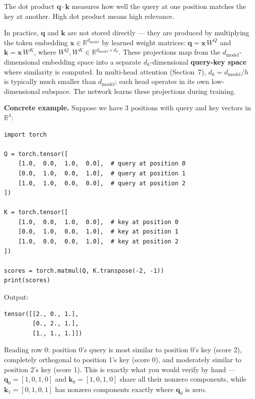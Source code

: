 The dot product $\mathbf{q} \cdot \mathbf{k}$ measures how well the query at one position matches the key at another. High dot product means high relevance.

In practice, $\mathbf{q}$ and $\mathbf{k}$ are not stored directly --- they are produced by multiplying the token embedding $\mathbf{x} \in \mathbb{R}^{d_{\text{model}}}$ by learned weight matrices: $\mathbf{q} = \mathbf{x}\, W^Q$ and $\mathbf{k} = \mathbf{x}\, W^K$, where $W^Q, W^K \in \mathbb{R}^{d_{\text{model}} \times d_k}$. These projections map from the $d_{\text{model}}$-dimensional embedding space into a separate $d_k$-dimensional \textbf{query-key space} where similarity is computed. In multi-head attention (Section~7), $d_k = d_{\text{model}} / h$ is typically much smaller than $d_{\text{model}}$; each head operates in its own low-dimensional subspace. The network learns these projections during training.

\textbf{Concrete example.} Suppose we have 3 positions with query and key vectors in $\mathbb{R}^4$:

\demotag
\begin{lstlisting}
import torch

Q = torch.tensor([
    [1.0,  0.0,  1.0,  0.0],  # query at position 0
    [0.0,  1.0,  0.0,  1.0],  # query at position 1
    [1.0,  1.0,  0.0,  0.0],  # query at position 2
])

K = torch.tensor([
    [1.0,  0.0,  1.0,  0.0],  # key at position 0
    [0.0,  1.0,  0.0,  1.0],  # key at position 1
    [1.0,  0.0,  0.0,  1.0],  # key at position 2
])

scores = torch.matmul(Q, K.transpose(-2, -1))
print(scores)
\end{lstlisting}

Output:

\outputtag
\begin{lstlisting}
tensor([[2., 0., 1.],
        [0., 2., 1.],
        [1., 1., 1.]])
\end{lstlisting}

Reading row 0: position 0's query is most similar to position 0's key (score 2), completely orthogonal to position 1's key (score 0), and moderately similar to position 2's key (score 1). This is exactly what you would verify by hand --- $\mathbf{q}_0 = [1, 0, 1, 0]$ and $\mathbf{k}_0 = [1, 0, 1, 0]$ share all their nonzero components, while $\mathbf{k}_1 = [0, 1, 0, 1]$ has nonzero components exactly where $\mathbf{q}_0$ is zero.


